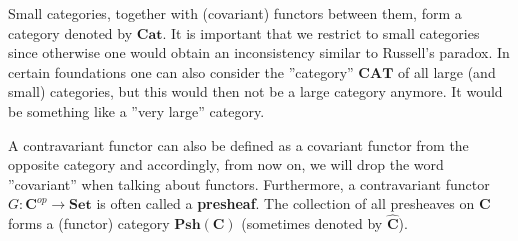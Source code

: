     \begin{notation}
        Small categories, together with (covariant) functors between them, form a category denoted by $\mathbf{Cat}$. It is important that we restrict to small categories since otherwise one would obtain an inconsistency similar to Russell's paradox. In certain foundations one can also consider the ''category'' $\mathbf{CAT}$ of all large (and small) categories, but this would then not be a large category anymore. It would be something like a ''very large'' category.
    \end{notation}
    \begin{remark}[Presheaves]
        A contravariant functor can also be defined as a covariant functor from the opposite category and accordingly, from now on, we will drop the word ''covariant'' when talking about functors. Furthermore, a contravariant functor $G:\mathbf{C}^{op}\rightarrow\mathbf{Set}$ is often called a \textbf{presheaf}. The collection of all presheaves on $\mathbf{C}$ forms a (functor) category $\mathbf{Psh}(\mathbf{C})$ (sometimes denoted by $\widehat{\mathbf{C}}$).
    \end{remark}

